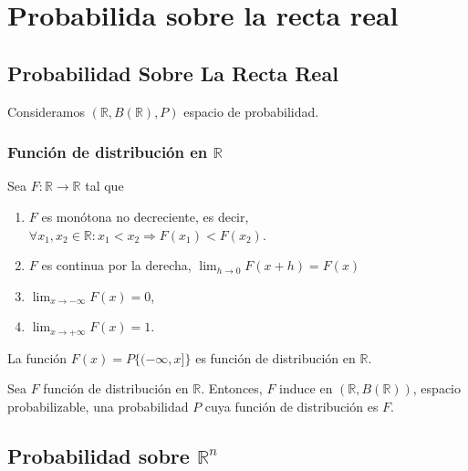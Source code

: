 \chapter{Probabilida sobre la recta real}

\section{Probabilidad Sobre La Recta Real}

\begin{nota}
  Consideramos $(\mathbb{R}, B(\mathbb{R}), P)$ espacio de probabilidad.
\end{nota}

\subsection{Función de distribución en $\mathbb{R}$}

\begin{defn}
  Sea $F: \mathbb{R} \to \mathbb{R}$ tal que
  \begin{enumerate}[label=(\roman*)]
    \item $F$ es monótona no decreciente, es decir, $ \forall x_{1}, x_{2} \in \mathbb{R}: x_{1} < x_{2} \Rightarrow F(x_{1}) < F(x_{2})$.
    \item $F$ es continua por la derecha, $\lim_{h \to 0} F(x + h) = F(x)$
    \item $\lim_{x \to -\infty} F(x) = 0$,
    \item $\lim_{x \to +\infty} F(x) = 1$.
  \end{enumerate}
\end{defn}

\begin{theo}
  La función $F(x) = P \{ (- \infty, x] \}$ es función de distribución en $\mathbb{R}$.
\end{theo}

\begin{theo}
  Sea $F$ función de distribución en $\mathbb{R}$. Entonces, $F$ induce en $(\mathbb{R}, B(\mathbb{R}))$, espacio probabilizable, una probabilidad $P$ cuya función de distribución es $F$.
\end{theo}

\section{Probabilidad sobre $\mathbb{R}^n$}
